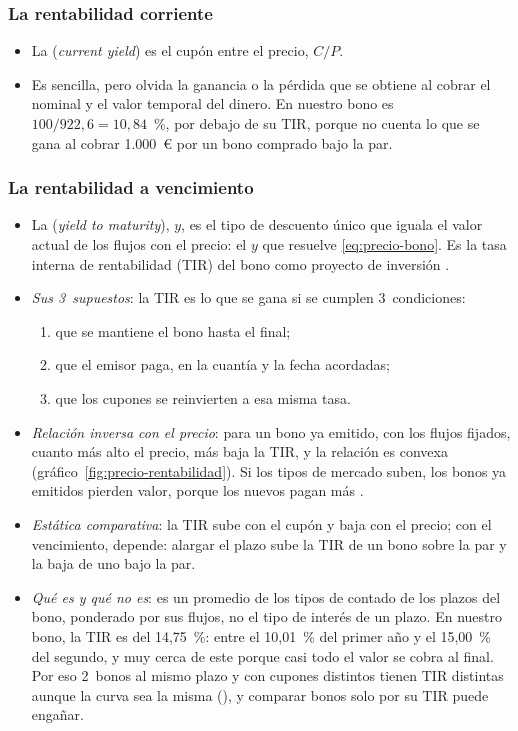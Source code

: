 \documentclass[11pt]{article}
\begin{document}
\subsubsection{La rentabilidad corriente}\label{sec:rent-corriente}

\begin{itemize}
\item La  (\emph{current yield}) es el cupón entre el precio, $C/P$.
\item Es sencilla, pero olvida la ganancia o la pérdida que se obtiene al cobrar el nominal y el valor temporal del dinero. En nuestro bono es $100/922{,}6=10{,}84$~\%, por debajo de su TIR, porque no cuenta lo que se gana al cobrar 1.000~€ por un bono comprado bajo la par.
\end{itemize}

\subsubsection{La rentabilidad a vencimiento}\label{sec:tir}

\begin{itemize}
\item La  (\emph{yield to maturity}), $y$, es el tipo de descuento único que iguala el valor actual de los flujos con el precio: el $y$ que resuelve \eqref{eq:precio-bono}. Es la tasa interna de rentabilidad (TIR) del bono como proyecto de inversión .
\item \emph{Sus 3~supuestos}: la TIR es lo que se gana si se cumplen 3~condiciones:
  \begin{enumerate}
  \item que se mantiene el bono hasta el final;
  \item que el emisor paga, en la cuantía y la fecha acordadas;
  \item que los cupones se reinvierten a esa misma tasa.
  \end{enumerate}
\item \emph{Relación inversa con el precio}: para un bono ya emitido, con los flujos fijados, cuanto más alto el precio, más baja la TIR, y la relación es convexa (gráfico~\ref{fig:precio-rentabilidad}). Si los tipos de mercado suben, los bonos ya emitidos pierden valor, porque los nuevos pagan más .
\item \emph{Estática comparativa}: la TIR sube con el cupón y baja con el precio; con el vencimiento, depende: alargar el plazo sube la TIR de un bono sobre la par y la baja de uno bajo la par.
\item \emph{Qué es y qué no es}: es un promedio de los tipos de contado de los plazos del bono, ponderado por sus flujos, no el tipo de interés de un plazo. En nuestro bono, la TIR es del 14,75~\%: entre el 10,01~\% del primer año y el 15,00~\% del segundo, y muy cerca de este porque casi todo el valor se cobra al final. Por eso 2~bonos al mismo plazo y con cupones distintos tienen TIR distintas aunque la curva sea la misma (), y comparar bonos solo por su TIR puede engañar.
\end{itemize}
\end{document}
